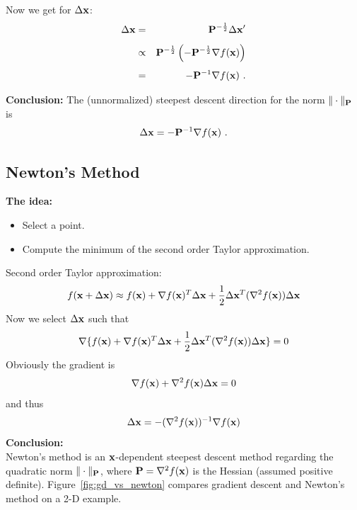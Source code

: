 Now we get for $\Delta \bm{\mathrm{x}}$:
\begin{eqnarray*}
  \Delta \bm{\mathrm{x}}
    &=& {\mathbf{P}}^{-\frac{1}{2}} \Delta \bm{\mathrm{x}}' \\[.15cm]
    &\propto& {\mathbf{P}}^{-\frac{1}{2}} \left( - {\mathbf{P}}^{-\frac{1}{2}}\nabla f(\bm{\mathrm{x}}) \right) \\[.15cm]
    &=& - \mathbf{P}^{-1} \nabla f(\bm{\mathrm{x}})~.
\end{eqnarray*}

\textbf{Conclusion:} The (unnormalized) steepest descent direction for the norm $\|\cdot\|_{\mathbf{P}}$ is
\begin{displaymath}
   \Delta \bm{\mathrm{x}} = -\mathbf{P}^{-1} \nabla f(\bm{\mathrm{x}})~.
\end{displaymath}

\subsection{Newton's Method}
   \textbf{The idea:}
  \begin{itemize}
    \item Select a point.
    \item Compute the minimum of the second order Taylor approximation.
  \end{itemize}
 Second order Taylor approximation:
  \begin{displaymath}
    f(\bm{\mathrm{x}}+\Delta \bm{\mathrm{x}}) 
    \approx f(\bm{\mathrm{x}}) + \nabla f(\bm{\mathrm{x}})^T \Delta \bm{\mathrm{x}} + \frac{1}{2} \Delta \bm{\mathrm{x}}^T (\nabla^2 f(\bm{\mathrm{x}}))\Delta \bm{\mathrm{x}} 
  \end{displaymath}
  Now we select $\Delta \bm{\mathrm{x}}$ such that 
  \begin{displaymath}
    \nabla\{  f(\bm{\mathrm{x}}) + \nabla f(\bm{\mathrm{x}})^T \Delta \bm{\mathrm{x}} + \frac{1}{2}\Delta \bm{\mathrm{x}}^T (\nabla^2 f(\bm{\mathrm{x}}))\Delta \bm{\mathrm{x}}\} 
    = 0
  \end{displaymath}
  Obviously the gradient is
  \begin{displaymath}
    \nabla f(\bm{\mathrm{x}})+ \nabla^2 f(\bm{\mathrm{x}})\Delta \bm{\mathrm{x}} 
    = 0
  \end{displaymath}
  and thus
  \begin{displaymath}
    \Delta \bm{\mathrm{x}} 
    = -(\nabla^2 f(\bm{\mathrm{x}}))^{-1} \nabla f(\bm{\mathrm{x}})
  \end{displaymath} 
\textbf{Conclusion:} \\
  Newton's method is an $\bm{\mathrm{x}}$-dependent steepest descent method regarding the quadratic norm $\|\cdot\|_{\mathbf{P}}$, where $\mathbf{P} = \nabla^2 f(\bm{\mathrm{x}})$ is the Hessian (assumed positive definite).
  Figure~\ref{fig:gd_vs_newton} compares gradient descent and Newton's method on a 2-D example.


